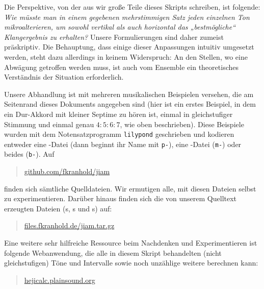 Die Perspektive, von der aus wir große Teile dieses Skripts schreiben, ist
folgende: \emph{Wie müsste man in einem gegebenen mehrstimmigen Satz jeden
  einzelnen Ton mikroalterieren, um sowohl vertikal als auch horizontal das
  „bestmögliche“ Klangergebnis zu erhalten?} Unsere Formulierungen sind daher
zumeist präskriptiv. Die Behauptung, dass einige dieser Anpassungen intuitiv
umgesetzt werden, steht dazu allerdings in keinem Widerspruch: An den Stellen,
wo eine Abwägung getroffen werden muss, ist auch vom Ensemble ein theoretisches
Verständnis der Situation erforderlich.


Unsere Abhandlung ist mit mehreren musikalischen Beispielen versehen, die am
Seitenrand dieses Dokuments angegeben sind (hier ist ein erstes
Beispiel, in dem ein Dur-Akkord mit kleiner Septime zu hören ist, einmal in
gleichstufiger Stimmung und einmal genau \mbox{$4:5:6:7$}, wie oben
beschrieben). Diese Beispiele wurden mit dem Notensatzprogramm \verb!lilypond!
geschrieben und kodieren entweder eine -Datei (dann beginnt ihr
Name mit \verb!p-!), eine -Datei (\verb!m-!) oder beides
(\verb!b-!). Auf
\begin{quote}
  \href{https://github.com/fkranhold/jiam/}{\textsf{github.com/fkranhold/jiam}}
\end{quote}
finden sich sämtliche Quelldateien.  Wir ermutigen alle, mit diesen Dateien
selbst zu experimentieren. Darüber hinaus finden sich die von unserem Quelltext
erzeugten Dateien (s, s und s) auf:
\begin{quote}
  \href{https://files.fkranhold.de/jiam.tar.gz}{\textsf{files.fkranhold.de/jiam.tar.gz}}
\end{quote}
Eine weitere sehr hilfreiche Ressource beim Nachdenken und Experimentieren ist
folgende Webanwendung, die alle in diesem Skript behandelten (nicht
gleichstufigen) Töne und Intervalle sowie noch unzählige weitere berechnen kann:
\begin{quote}
	\href{https://hejicalc.plainsound.org/}{\textsf{hejicalc.plainsound.org}}
\end{quote}


